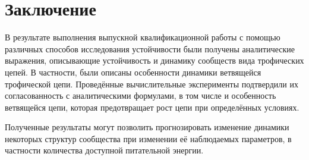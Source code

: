 \section{Заключение}
    В результате выполнения выпускной квалификационной работы с помощью различных способов исследования устойчивости были получены аналитические выражения, описывающие устойчивость и динамику сообществ вида трофических цепей. В частности, были описаны особенности динамики ветвящейся трофической цепи. Проведённые вычислительные эксперименты подтвердили их согласованность с аналитическими формулами, в том числе и особенность ветвящейся цепи, которая предотвращает рост цепи при определённых условиях.
    
    Полученные результаты могут позволить прогнозировать изменение динамики некоторых структур сообщества при изменении её наблюдаемых параметров, в частности количества доступной питательной энергии.

